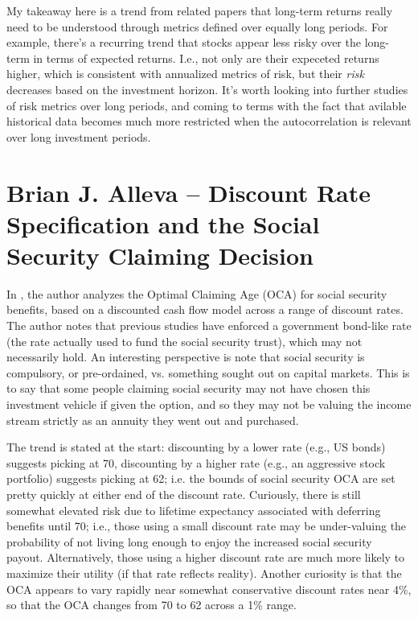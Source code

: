 \documentclass{article}
\begin{document}
My takeaway here is a trend from related papers that long-term returns really need to be understood through metrics defined over equally long periods.  For example, there's a recurring trend that stocks appear less risky over the long-term in terms of expected returns.  I.e., not only are their expeceted returns higher, which is consistent with annualized metrics of risk, but their {\it risk} decreases based on the investment horizon.  It's worth looking into further studies of risk metrics over long periods, and coming to terms with the fact that avilable historical data becomes much more restricted when the autocorrelation is relevant over long investment periods.


\section{Brian J. Alleva -- Discount Rate Specification and the Social Security Claiming Decision}

In \cite{Alleva2016}, the author analyzes the Optimal Claiming Age (OCA) for social security benefits, based on a discounted cash flow model across a range of discount rates.  The author notes that previous studies have enforced a government bond-like rate (the rate actually used to fund the social security trust), which may not necessarily hold.  An interesting perspective is note that social security is compulsory, or pre-ordained, vs. something sought out on capital markets.  This is to say that some people claiming social security may not have chosen this investment vehicle if given the option, and so they may not be valuing the income stream strictly as an annuity they went out and purchased.

The trend is stated at the start: discounting by a lower rate (e.g., US bonds) suggests picking at 70, discounting by a higher rate (e.g., an aggressive stock portfolio) suggests picking at 62; i.e. the bounds of social security OCA are set pretty quickly at either end of the discount rate.  Curiously, there is still somewhat elevated risk due to lifetime expectancy associated with deferring benefits until 70; i.e., those using a small discount rate may be under-valuing the probability of not living long enough to enjoy the increased social security payout.  Alternatively, those using a higher discount rate are much more likely to maximize their utility (if that rate reflects reality).  Another curiosity is that the OCA appears to vary rapidly near somewhat conservative discount rates near 4\%, so that the OCA changes from 70 to 62 across a 1\% range.  
\end{document}
